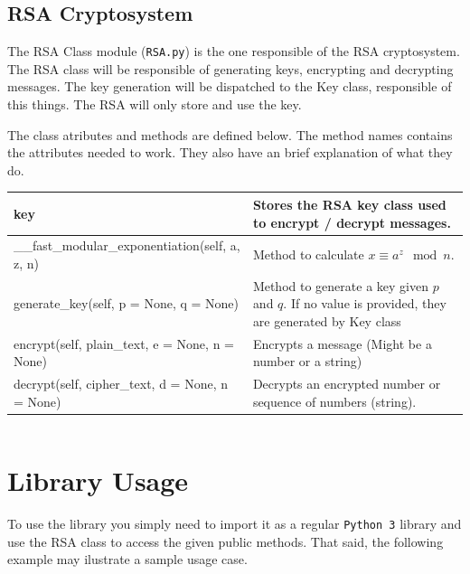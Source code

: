 \documentclass[usenames,dvipsnames,12pt]{report}
\begin{document}
\inputminted[linenos, breaklines=true]{python}{../Python/RSACryptosystem/Key.py}

\section{RSA Cryptosystem}

The RSA Class module (\texttt{RSA.py}) is the one responsible of the RSA cryptosystem.\\

The RSA class will be responsible of generating keys, encrypting and decrypting messages.
The key generation will be dispatched to the Key class, responsible of this things. The
RSA will only store and use the key.

The class atributes and methods are defined below. The method names contains the attributes needed to work.
They also have an brief explanation of what they do.

\begin{center}
    \begin{tabular}{ | l | p{6cm} |}
    \hline
    key & Stores the RSA key class used to encrypt / decrypt messages.\\ \hline
    \_\_fast\_modular\_exponentiation(self, a, z, n) & Method to calculate $x \equiv a^z \mod n$.\\ \hline
    generate\_key(self, p = None, q = None) & Method to generate a key given $p$ and $q$. If no value is provided, they are generated by Key class\\ \hline
    encrypt(self, plain\_text, e = None, n = None) & Encrypts a message (Might be a number or a string)\\ \hline
    decrypt(self, cipher\_text, d = None, n = None) & Decrypts an encrypted number or sequence of numbers (string).\\
    \hline
    \end{tabular}
\end{center}

\inputminted[linenos, breaklines=true]{python}{../Python/RSACryptosystem/RSA.py}

\chapter{Library Usage}

To use the library you simply need to import it as a regular \texttt{Python 3} library and use the RSA class
to access the given public methods. That said, the following example may ilustrate a sample usage case.
\end{document}
